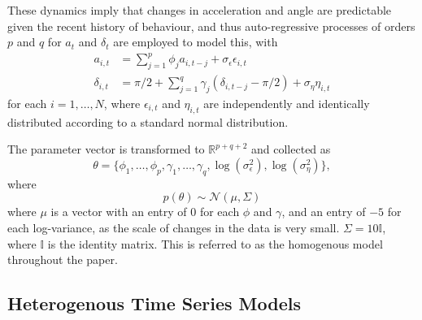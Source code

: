 \documentclass[12pt,a4paper]{article}\usepackage[]{graphicx}\usepackage[]{color}
\begin{document}
These dynamics imply that changes in acceleration and angle are predictable given the recent history of behaviour, and thus auto-regressive processes of orders $p$ and $q$ for $a_t$ and $\delta_t$ are employed to model this, with
\begin{align}
a_{i, t} &= \sum_{j = 1}^p \phi_{j} a_{i, t-j} + \sigma_{\epsilon} \epsilon_{i, t} \label{aAR} \\
\delta_{i, t} &= \pi/2 + \sum_{j = 1}^q \gamma_{j} (\delta_{i, t-j} - \pi/2) + \sigma_{\eta} \eta_{i, t} \label{dAR}
\end{align}
for each $i = 1, \dots, N$, where $\epsilon_{i, t}$ and $\eta_{i, t}$ are independently and identically distributed according to a standard normal distribution.

The parameter vector is transformed to $\mathbb{R}^{p + q + 2}$ and collected as 
\begin{equation*}
\label{thetaVec}
\theta = \{\phi_{1}, \dots, \phi_{p}, \gamma_{1}, \dots, \gamma_{q}, \log(\sigma^{2}_{\epsilon}), \log(\sigma^{2}_{\eta})\},
\end{equation*}
where
\begin{equation}
\label{indPrior}
p(\theta) \sim \mathcal{N}\left(\mu, \Sigma \right)
\end{equation}
where $\mu$ is a vector with an entry of $0$ for each $\phi$ and $\gamma$, and an entry of $-5$ for each log-variance, as the scale of changes in the data is very small. $\Sigma = 10 \mathbb{I}$, where $\mathbb{I}$ is the identity matrix. This is referred to as the homogenous model throughout the paper.

\subsection{Heterogenous Time Series Models}
\label{subsec:heterogenous}
\end{document}
